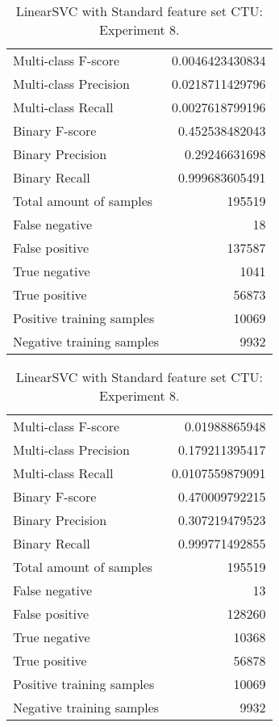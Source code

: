 \begin{table}[H]
\begin{minipage}{0.5\textwidth}
\caption{LinearSVC with Standard feature set CTU: Experiment 7.}
\centering
\begin{tabular}{l r}
\toprule
Multi-class F-score & 0.0046423430834 \\
Multi-class Precision & 0.0218711429796 \\
Multi-class Recall & 0.0027618799196 \\
\midrule
Binary F-score & 0.452538482043 \\
Binary Precision & 0.29246631698 \\
Binary Recall & 0.999683605491 \\
\midrule
Total amount of samples & 195519 \\
False negative & 18 \\
False positive & 137587 \\
True negative & 1041 \\
True positive & 56873 \\
\midrule
Positive training samples & 10069 \\
Negative training samples & 9932 \\
\bottomrule
\end{tabular}
\end{minipage}
\hfillx
\begin{minipage}{0.5\textwidth}
\caption{LinearSVC with Standard feature set CTU: Experiment 8.}
\centering
\begin{tabular}{l r}
\toprule
Multi-class F-score & 0.01988865948 \\
Multi-class Precision & 0.179211395417 \\
Multi-class Recall & 0.0107559879091 \\
\midrule
Binary F-score & 0.470009792215 \\
Binary Precision & 0.307219479523 \\
Binary Recall & 0.999771492855 \\
\midrule
Total amount of samples & 195519 \\
False negative & 13 \\
False positive & 128260 \\
True negative & 10368 \\
True positive & 56878 \\
\midrule
Positive training samples & 10069 \\
Negative training samples & 9932 \\
\bottomrule
\end{tabular}
\end{minipage}
\end{table}
